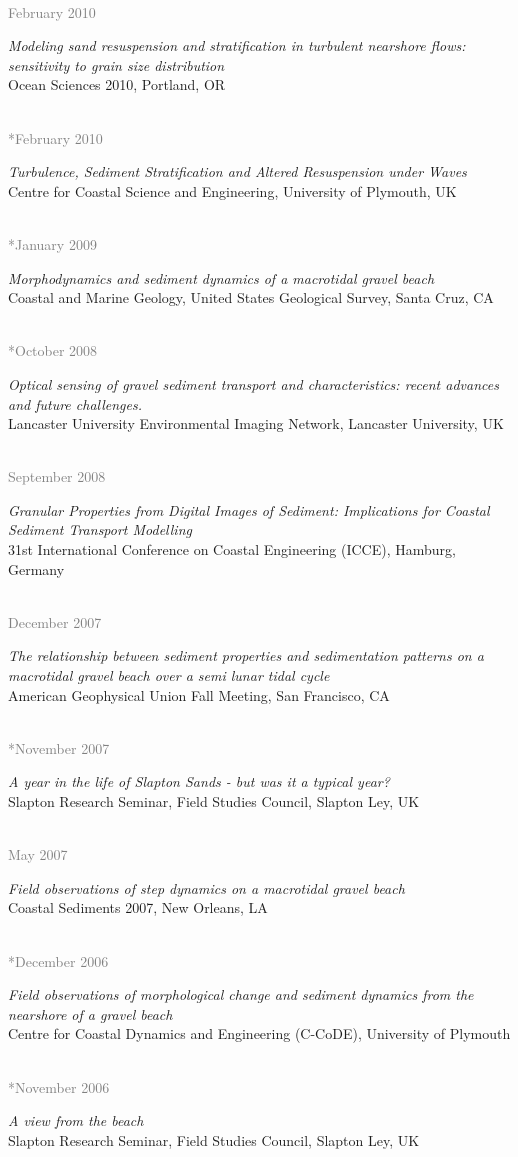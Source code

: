 \documentclass{article} %
\newlength\sidebarwidth
\newcommand{\dateonly}[2][]
	 {\begin{minipage}{\textwidth}
	 \vspace*{.4\baselineskip}
         \nopagebreak\hspace{0in}%
         \nopagebreak\begin{minipage}[t]{\sidebarwidth - .2cm}
         \raggedleft {~}
         {\\[-\baselineskip] \textcolor{gray}{\footnotesize #1}}
	 \end{minipage}%
	 \hfill
	 \begin{minipage}[t]{\linewidth - \sidebarwidth}
	 #2%
	 \end{minipage}%
	 \vspace*{.2\baselineskip plus 1\baselineskip minus
	 .2\baselineskip}%
	 \end{minipage}}
\begin{document}
  \dateonly[February 2010]{
      {\it Modeling sand resuspension and stratification in turbulent nearshore flows: sensitivity to grain size distribution}\\
      Ocean Sciences 2010, Portland, OR
    }

  \dateonly[**February 2010]{
      {\it Turbulence, Sediment Stratification and Altered Resuspension under Waves}\\
      Centre for Coastal Science and Engineering, University of Plymouth, UK
    }

  \dateonly[**January 2009]{
    {\it Morphodynamics and sediment dynamics of a macrotidal gravel beach}\\
    Coastal and Marine Geology, United States Geological Survey, Santa Cruz, CA
  }

  \dateonly[**October 2008]{
    {\it Optical sensing of gravel sediment transport and characteristics: recent advances and future challenges.}\\
    Lancaster University Environmental Imaging Network, Lancaster University, UK
  }

  \dateonly[September 2008]{
      {\it Granular Properties from Digital Images of Sediment: Implications for Coastal Sediment Transport Modelling}\\
      31st International Conference on Coastal Engineering (ICCE), Hamburg, Germany
  }

  \dateonly[December 2007]{
      {\it The relationship between sediment properties and sedimentation patterns on a macrotidal gravel beach over a semi lunar tidal cycle}\\
      American Geophysical Union Fall Meeting, San Francisco, CA
  }

  \dateonly[**November 2007]{
    {\it A year in the life of Slapton Sands - but was it a typical year?}\\
    Slapton Research Seminar, Field Studies Council, Slapton Ley, UK
  }

  \dateonly[May 2007]{
      {\it Field observations of step dynamics on a macrotidal gravel beach}\\
      Coastal Sediments 2007, New Orleans, LA
  }

  \dateonly[**December 2006]{
    {\it Field observations of morphological change and sediment dynamics from the nearshore of a gravel beach}\\
    Centre for Coastal Dynamics and Engineering (C-CoDE), University of Plymouth
  }

  \dateonly[**November 2006]{
    {\it A view from the beach}\\
    Slapton Research Seminar, Field Studies Council, Slapton Ley, UK
  }
\end{document}
